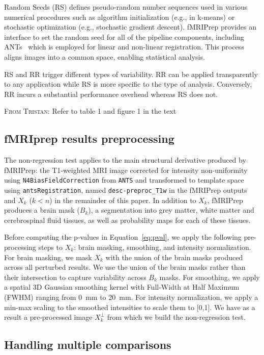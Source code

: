 \documentclass{article}
\newcommand{\TG}[1]{\color{blue}\textsc{From Tristan:} #1\color{black}\xspace}
\newcommand{\fmriprep}{fMRIPrep\xspace}
\newcommand{\fwhm}{\textsc{FWHM}}
\begin{document}
Random Seeds (RS) defines pseudo-random number sequences used in various numerical procedures such as algorithm initialization (e.g., in k-means) or stochastic optimization (e.g., stochastic gradient descent). \fmriprep provides an interface to set the random seed for all of the pipeline components, including ANTs~\cite{avants2009advanced} which is employed for linear and non-linear registration. This process aligns images into a common space, enabling statistical analysis.

RS and RR trigger different types of variability. RR can be applied transparently to any application while RS is more specific to the type of analysis. Conversely, RR incurs a substantial performance overhead whereas RS does not.

\TG{Refer to table 1 and figure 1 in the text}

\subsection{fMRIprep results preprocessing}

The non-regression test applies to the main structural derivative produced by \fmriprep: the T1-weighted MRI image corrected for intensity non-uniformity using \texttt{N4BiasFieldCorrection} from \texttt{ANTS} and transformed to template space using \texttt{antsRegistration}, named \texttt{desc-preproc\_T1w} in the \fmriprep outputs and $X_k$ ($k < n$) in the remainder of this paper. In addition to $X_k$, \fmriprep produces a brain mask ($B_k$), a segmentation into grey matter, white matter and cerebrospinal fluid tissues, as well as probability maps for each of these tissues.

Before computing the p-values in Equation~\ref{eq:pval}, we apply the following pre-processing steps to $X_k$: brain masking, smoothing, and intensity normalization. For brain masking, we mask $X_k$ with the union of the brain masks produced across all perturbed results. We use the union of the brain masks rather than their intersection to capture variability across $B_k$ masks. For smoothing, we apply a spatial 3D Gaussian smoothing kernel with Full-Width at Half Maximum (\fwhm) ranging from 0~mm to 20~mm. For intensity normalization, we apply a min-max scaling to the smoothed intensities to scale them to [0,1].
We have as a result a pre-processed image $X_k^\perp$ from which we build the non-regression test.

\subsection{Handling multiple comparisons}
\end{document}
